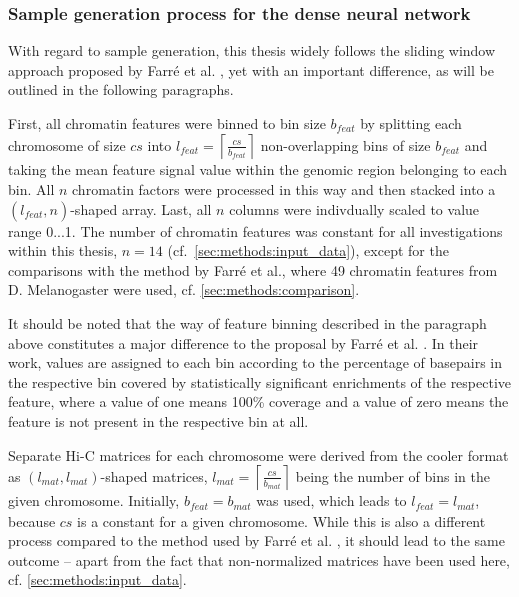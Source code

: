 \subsubsection{Sample generation process for the dense neural network} \label{sec:methods:sample_gen}
With regard to sample generation, this thesis widely follows the sliding window approach proposed by Farr\'e et al. \cite{Farre2018a},
yet with an important difference, as will be outlined in the following paragraphs.

First, all chromatin features were binned to bin size $b_\mathit{feat}$ by splitting each chromosome of size $cs$ into 
$l_\mathit{feat}=\left \lceil{\frac{cs}{b_\mathit{feat}}}\right \rceil$ non-overlapping bins of size $b_\mathit{feat}$
and taking the mean feature signal value within the genomic region belonging to each bin.
All $n$ chromatin factors were processed in this way and then stacked into a $(l_\mathit{feat},n)$-shaped array.
Last, all $n$ columns were indivdually scaled to value range 0...1. 
The number of chromatin features was constant for all investigations within this thesis, $n=14$ (cf.~\cref{sec:methods:input_data}),
except for the comparisons with the method by Farr\'e et al., where 49 chromatin features from D. Melanogaster were used, cf. \cref{sec:methods:comparison}.

It should be noted that the way of feature binning described in the paragraph above constitutes a major difference to the proposal by Farr\'e et al. \cite[p.~9]{Farre2018a}.
In their work, values are assigned to each bin according to the percentage of basepairs in the respective bin covered by statistically significant enrichments of the respective feature,
where a value of one means 100\% coverage and a value of zero means the feature is not present in the respective bin at all.

Separate Hi-C matrices for each chromosome were derived from the cooler format as $(l_\mathit{mat}, l_\mathit{mat})$-shaped matrices, 
$l_\mathit{mat}=\left \lceil{\frac{cs}{b_\mathit{mat}}}\right \rceil$ being the number of bins in the given chromosome. 
Initially, $b_\mathit{feat} = b_\mathit{mat}$ was used, which leads to $l_\mathit{feat} = l_\mathit{mat}$, because $cs$ is a constant for a given chromosome.
While this is also a different process compared to the method used by Farr\'e et al. \cite[p.~8\,f.]{Farre2018a}, it should lead to the same outcome --
apart from the fact that non-normalized matrices have been used here, cf. \cref{sec:methods:input_data}.

